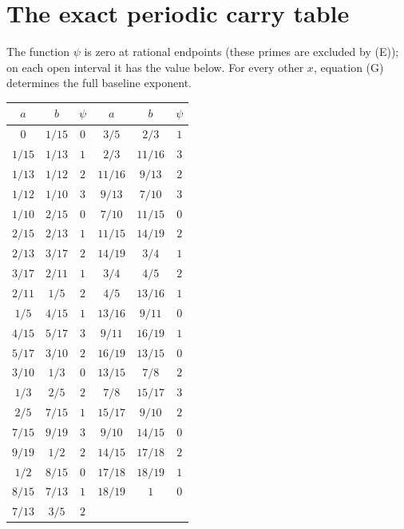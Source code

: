 \documentclass[11pt]{article}
\begin{document}
\section{The exact periodic carry table}
The function $\psi$ is zero at rational endpoints (these primes are
excluded by (E)); on each open interval it has the value below.
For every other $x$, equation (G) determines the full baseline exponent.
\begin{center}\small
\begin{tabular}{ccc@{\qquad}ccc}\toprule
$a$&$b$&$\psi$&$a$&$b$&$\psi$\\\midrule

$0$&$1/15$&$0$&$3/5$&$2/3$&$1$\\[0pt]

$1/15$&$1/13$&$1$&$2/3$&$11/16$&$3$\\[0pt]

$1/13$&$1/12$&$2$&$11/16$&$9/13$&$2$\\[0pt]

$1/12$&$1/10$&$3$&$9/13$&$7/10$&$3$\\[0pt]

$1/10$&$2/15$&$0$&$7/10$&$11/15$&$0$\\[0pt]

$2/15$&$2/13$&$1$&$11/15$&$14/19$&$2$\\[0pt]

$2/13$&$3/17$&$2$&$14/19$&$3/4$&$1$\\[0pt]

$3/17$&$2/11$&$1$&$3/4$&$4/5$&$2$\\[0pt]

$2/11$&$1/5$&$2$&$4/5$&$13/16$&$1$\\[0pt]

$1/5$&$4/15$&$1$&$13/16$&$9/11$&$0$\\[0pt]

$4/15$&$5/17$&$3$&$9/11$&$16/19$&$1$\\[0pt]

$5/17$&$3/10$&$2$&$16/19$&$13/15$&$0$\\[0pt]

$3/10$&$1/3$&$0$&$13/15$&$7/8$&$2$\\[0pt]

$1/3$&$2/5$&$2$&$7/8$&$15/17$&$3$\\[0pt]

$2/5$&$7/15$&$1$&$15/17$&$9/10$&$2$\\[0pt]

$7/15$&$9/19$&$3$&$9/10$&$14/15$&$0$\\[0pt]

$9/19$&$1/2$&$2$&$14/15$&$17/18$&$2$\\[0pt]

$1/2$&$8/15$&$0$&$17/18$&$18/19$&$1$\\[0pt]

$8/15$&$7/13$&$1$&$18/19$&$1$&$0$\\[0pt]

$7/13$&$3/5$&$2$&&&\\[0pt]

\bottomrule\end{tabular}\end{center}
\end{document}
